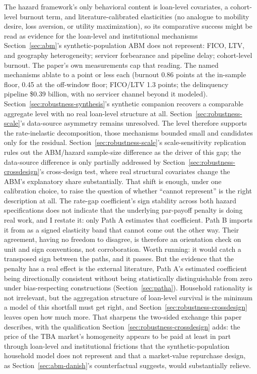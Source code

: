 \documentclass[12pt]{article}
\begin{document}
The hazard framework's only behavioral content is loan-level covariates, a cohort-level burnout term, and literature-calibrated elasticities (no analogue to mobility desire, loss aversion, or utility maximization), so its comparative success might be read as evidence for the loan-level and institutional mechanisms Section~\ref{sec:abm}'s synthetic-population ABM does not represent: FICO, LTV, and geography heterogeneity; servicer forbearance and pipeline delay; cohort-level burnout. The paper's own measurements cap that reading. The named mechanisms ablate to a point or less each (burnout 0.86 points at the in-sample floor, 0.45 at the off-window floor; FICO/LTV 1.3 points; the delinquency pipeline \$0.39 billion, with no servicer channel beyond it modeled). Section~\ref{sec:robustness-synthesis}'s synthetic companion recovers a comparable aggregate level with no real loan-level structure at all. Section~\ref{sec:robustness-scale}'s data-source asymmetry remains unresolved. The level therefore supports the rate-inelastic decomposition, those mechanisms bounded small and candidates only for the residual. Section~\ref{sec:robustness-scale}'s scale-sensitivity replication rules out the ABM/hazard sample-size difference as the driver of this gap; the data-source difference is only partially addressed by Section~\ref{sec:robustness-crossdesign}'s cross-design test, where real structural covariates change the ABM's explanatory share substantially. That shift is enough, under one calibration choice, to raise the question of whether ``cannot represent'' is the right description at all. The rate-gap coefficient's sign stability across both hazard specifications does not indicate that the underlying par-payoff penalty is doing real work, and I restate it: only Path A estimates that coefficient. Path B imports it from \citet{liebersohn2024} as a signed elasticity band that cannot come out the other way. Their agreement, having no freedom to disagree, is therefore an orientation check on unit and sign conventions, not corroboration. Worth running: it would catch a transposed sign between the paths, and it passes. But the evidence that the penalty has a real effect is the external literature, Path A's estimated coefficient being directionally consistent without being statistically distinguishable from zero under bias-respecting constructions (Section~\ref{sec:patha}). Household rationality is not irrelevant, but the aggregation structure of loan-level survival is the minimum a model of this shortfall must get right, and Section~\ref{sec:robustness-crossdesign} leaves open how much more. That sharpens the two-sided exchange this paper describes, with the qualification Section~\ref{sec:robustness-crossdesign} adds: the price of the TBA market's homogeneity appears to be paid at least in part through loan-level and institutional frictions that the synthetic-population household model does not represent and that a market-value repurchase design, as Section~\ref{sec:abm-danish}'s counterfactual suggests, would substantially relieve.
\clearpage
\end{document}
